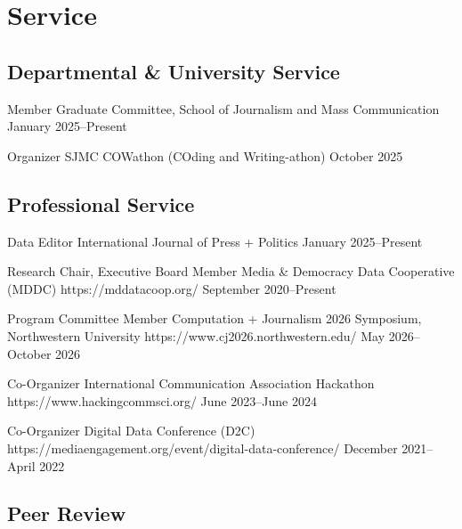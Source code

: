 \section{Service}


\subsection{Departmental \& University Service}

\cvservice
  {Member}
  {Graduate Committee, School of Journalism and Mass Communication}
  {}
  {January 2025--Present}

\cvservice
  {Organizer}
  {SJMC COWathon (COding and Writing-athon)}
  {}
  {October 2025}

\subsection{Professional Service}

\cvservice
  {Data Editor}
  {International Journal of Press + Politics}
  {}
  {January 2025--Present}

\cvservice
  {Research Chair, Executive Board Member}
  {Media \& Democracy Data Cooperative (MDDC)}
  {https://mddatacoop.org/}
  {September 2020--Present}

\cvservice
  {Program Committee Member}
  {Computation + Journalism 2026 Symposium, Northwestern University}
  {https://www.cj2026.northwestern.edu/}
  {May 2026--October 2026}

\cvservice
  {Co-Organizer}
  {International Communication Association Hackathon}
  {https://www.hackingcommsci.org/}
  {June 2023--June 2024}

\cvservice
  {Co-Organizer}
  {Digital Data Conference (D2C)}
  {https://mediaengagement.org/event/digital-data-conference/}
  {December 2021--April 2022}

\subsection{Peer Review}


